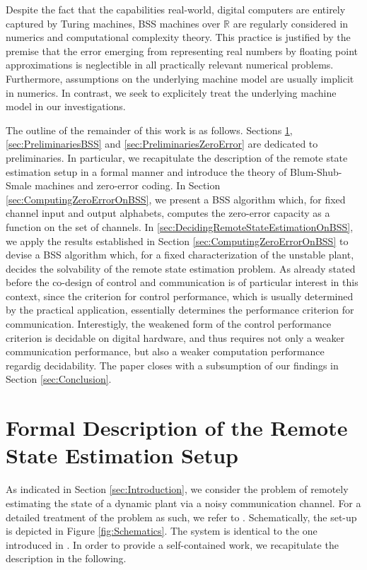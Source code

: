 \documentclass[conference]{IEEEtran}
\def\RR{{\mathbb R}}
\newcommand{\tbr}[1]{}
\begin{document}
	Despite the fact that the capabilities real-world, digital computers are 
	entirely captured by Turing machines, BSS machines over \(\RR\) are regularly considered in numerics and computational complexity theory. 
	This practice is justified by the premise that the error emerging from representing real numbers by floating point approximations is neglectible in all practically relevant numerical problems. 
	Furthermore, assumptions on the underlying machine model are usually implicit in numerics. In contrast, we seek to explicitely treat the underlying machine model in our investigations.

	The outline of the remainder of this work is as follows. Sections \ref{sec:FormalEstimationSetup}, \ref{sec:PreliminariesBSS} and \ref{sec:PreliminariesZeroError} are dedicated to preliminaries. 
	In particular, we recapitulate the description of the remote state estimation setup in a formal manner and introduce the theory of Blum-Shub-Smale machines and zero-error coding.
	In Section \ref{sec:ComputingZeroErrorOnBSS}, we present a BSS algorithm which, for fixed channel input and output alphabets, computes the zero-error capacity as a function on 
	the set of channels. In \ref{sec:DecidingRemoteStateEstimationOnBSS}, we apply the results established in Section \ref{sec:ComputingZeroErrorOnBSS} to devise a BSS algorithm
	which, for a fixed characterization of the unstable plant, decides the solvability of the remote state estimation problem. 
	As already stated before the co-design of control and communication is of particular interest in this context, since the criterion for control performance, which is
	usually determined by the practical application, essentially determines the performance criterion for communication. Interestigly, the weakened form of the control performance criterion 
	is decidable on digital hardware, and thus requires not only a weaker communication performance, but also a weaker computation performance regardig decidability. 
	The paper closes with a subsumption of 
	our findings in Section \ref{sec:Conclusion}.
                                                                        
\section{Formal Description of the Remote State Estimation Setup}	\label{sec:FormalEstimationSetup}
	\noindent As indicated in Section \ref{sec:Introduction}, we consider the problem of remotely estimating the state of a dynamic plant via a noisy communication channel. 
	For a detailed treatment of the problem as such, we refer to \cite{MS07}. Schematically, the set-up is depicted in Figure \ref{fig:Schematics}. 
	The system is identical to the one introduced in \cite{BoBoDe21}\tbr{{\color{red}\(\leftarrow\) Change to TAC!~}}. In order to provide a self-contained work, we recapitulate 
	the description in the following.
\end{document}
